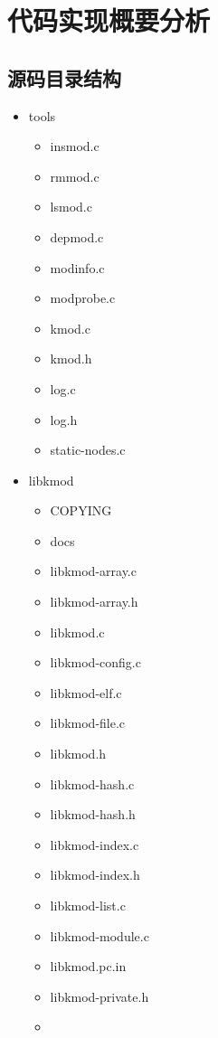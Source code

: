 \section{代码实现概要分析}

\subsection{源码目录结构}

\begin{itemize}
\item
  tools
  \begin{itemize}
  \item
    insmod.c
  \item
    rmmod.c
  \item
    lsmod.c
  \item
    depmod.c
  \item
    modinfo.c
  \item
    modprobe.c
  \item
    kmod.c
  \item
    kmod.h
  \item
    log.c
  \item
    log.h
  \item
    static-nodes.c
  \end{itemize}
\item
  libkmod
  \begin{itemize}
  \item
    COPYING
  \item
    docs
  \item
    libkmod-array.c
  \item
    libkmod-array.h
  \item
    libkmod.c
  \item
    libkmod-config.c
  \item
    libkmod-elf.c
  \item
    libkmod-file.c
  \item
    libkmod.h
  \item
    libkmod-hash.c
  \item
    libkmod-hash.h
  \item
    libkmod-index.c
  \item
    libkmod-index.h
  \item
    libkmod-list.c
  \item
    libkmod-module.c
  \item
    libkmod.pc.in
  \item
    libkmod-private.h
  \item

\end{itemize}
\end{itemize}

